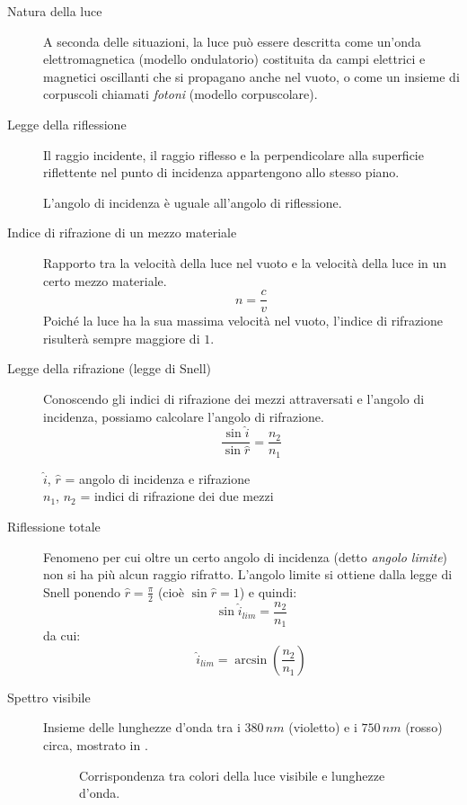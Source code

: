 \documentclass[a4paper,11pt,italian]{article}
\begin{document}
\begin{description}
  \item[Natura della luce] 
  A seconda delle situazioni, la luce può essere descritta come un'onda elettromagnetica (modello ondulatorio) costituita da campi elettrici e magnetici oscillanti che si propagano anche nel vuoto, o come un insieme di corpuscoli chiamati \emph{fotoni} (modello corpuscolare).
  
  \item[Legge della riflessione] 
  Il raggio incidente, il raggio riflesso e la perpendicolare alla superficie riflettente nel punto di incidenza appartengono allo stesso piano.
  
  L'angolo di incidenza è uguale all'angolo di riflessione.
  
  \item[Indice di rifrazione di un mezzo materiale] 
  Rapporto tra la velocità della luce nel vuoto e la velocità della luce in un certo mezzo materiale.
  \[ n = \frac{c}{v} \]
  Poiché la luce ha la sua massima velocità nel vuoto, l'indice di rifrazione risulterà sempre maggiore di $ 1 $.
  
  \item[Legge della rifrazione (legge di Snell)]
  Conoscendo gli indici di rifrazione dei mezzi attraversati e l'angolo di incidenza, possiamo calcolare l'angolo di rifrazione.
  \[ \frac{\sin \hat{i} }{\sin \hat{r}} = \frac{n_2}{n_1} \]
  \begin{multicols}{2}
  $ \hat{i} $, $ \hat{r} $ = angolo di incidenza e rifrazione\\
  $ n_1 $, $ n_2 $ = indici di rifrazione dei due mezzi
  \end{multicols}
  
  \item[Riflessione totale] 
  Fenomeno per cui oltre un certo angolo di incidenza (detto \emph{angolo limite}) non si ha più alcun raggio rifratto. L'angolo limite si ottiene dalla legge di Snell ponendo $ \hat{r} = \frac{\pi}{2} $ (cioè $ \sin \hat{r} = 1 $) e quindi:
  \[ \sin \hat{i}_{lim} = \frac{n_2}{n_1} \]
  da cui:
  \[ \hat{i}_{lim} = \arcsin \left( \frac{n_2}{n_1} \right) \]
  
  \item[Spettro visibile] 
  Insieme delle lunghezze d'onda tra i $ 380 \, nm $ (violetto) e i $ 750 \, nm $ (rosso) circa, mostrato in .
  
  \begin{figure}[htb]\centering
    \pgfspectra[axis,axis step=30,end=750]
    \caption{Corrispondenza tra colori della luce visibile e lunghezze d'onda.}
    \label{img:spettrovisibile}
  \end{figure}
  

\end{description}
\end{document}
